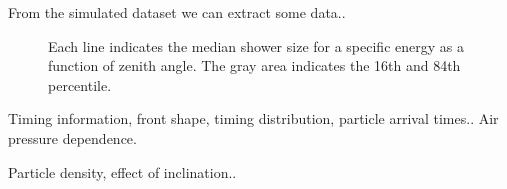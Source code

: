 
From the simulated dataset we can extract some data..

\begin{figure}
    \centering
    
    \caption{
             Each line indicates the median shower size for a specific
             energy as a function of zenith angle. The gray area
             indicates the 16th and 84th percentile.}
    \label{fig:simulations_shower_sizes}
\end{figure}

Timing information, front shape, timing distribution, particle arrival
times.. Air pressure dependence.

Particle density, effect of inclination..

